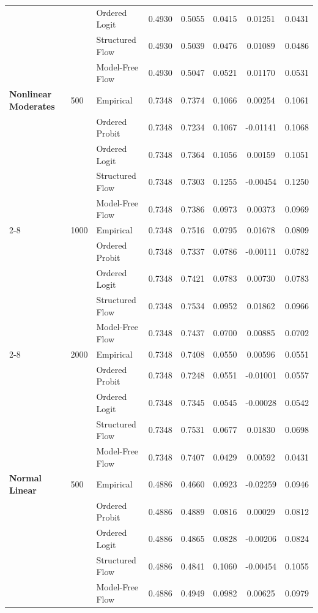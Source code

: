 \documentclass{article}
\numberwithin{figure}{section}
\numberwithin{table}{section}
\numberwithin{equation}{section}
\begin{document}
\begin{table}[ht]
\begin{tabular}{lllccccc}
 &  & Ordered Logit & 0.4930 & 0.5055 & 0.0415 & 0.01251 & 0.0431 \\
 &  & Structured Flow & 0.4930 & 0.5039 & 0.0476 & 0.01089 & 0.0486 \\
 &  & Model-Free Flow & 0.4930 & 0.5047 & 0.0521 & 0.01170 & 0.0531 \\
\midrule
\textbf{Nonlinear Moderates} & 500 & Empirical & 0.7348 & 0.7374 & 0.1066 & 0.00254 & 0.1061 \\
 &  & Ordered Probit & 0.7348 & 0.7234 & 0.1067 & -0.01141 & 0.1068 \\
 &  & Ordered Logit & 0.7348 & 0.7364 & 0.1056 & 0.00159 & 0.1051 \\
 &  & Structured Flow & 0.7348 & 0.7303 & 0.1255 & -0.00454 & 0.1250 \\
 &  & Model-Free Flow & 0.7348 & 0.7386 & 0.0973 & 0.00373 & 0.0969 \\
\cline{2-8}
 & 1000 & Empirical & 0.7348 & 0.7516 & 0.0795 & 0.01678 & 0.0809 \\
 &  & Ordered Probit & 0.7348 & 0.7337 & 0.0786 & -0.00111 & 0.0782 \\
 &  & Ordered Logit & 0.7348 & 0.7421 & 0.0783 & 0.00730 & 0.0783 \\
 &  & Structured Flow & 0.7348 & 0.7534 & 0.0952 & 0.01862 & 0.0966 \\
 &  & Model-Free Flow & 0.7348 & 0.7437 & 0.0700 & 0.00885 & 0.0702 \\
\cline{2-8}
 & 2000 & Empirical & 0.7348 & 0.7408 & 0.0550 & 0.00596 & 0.0551 \\
 &  & Ordered Probit & 0.7348 & 0.7248 & 0.0551 & -0.01001 & 0.0557 \\
 &  & Ordered Logit & 0.7348 & 0.7345 & 0.0545 & -0.00028 & 0.0542 \\
 &  & Structured Flow & 0.7348 & 0.7531 & 0.0677 & 0.01830 & 0.0698 \\
 &  & Model-Free Flow & 0.7348 & 0.7407 & 0.0429 & 0.00592 & 0.0431 \\
\midrule
\textbf{Normal Linear} & 500 & Empirical & 0.4886 & 0.4660 & 0.0923 & -0.02259 & 0.0946 \\
 &  & Ordered Probit & 0.4886 & 0.4889 & 0.0816 & 0.00029 & 0.0812 \\
 &  & Ordered Logit & 0.4886 & 0.4865 & 0.0828 & -0.00206 & 0.0824 \\
 &  & Structured Flow & 0.4886 & 0.4841 & 0.1060 & -0.00454 & 0.1055 \\
 &  & Model-Free Flow & 0.4886 & 0.4949 & 0.0982 & 0.00625 & 0.0979 \\

\end{tabular}
\end{table}
\end{document}
